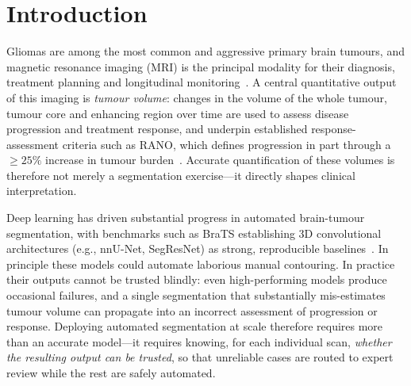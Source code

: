 \documentclass[11pt]{article}
\begin{document}
\section{Introduction}
Gliomas are among the most common and aggressive primary brain tumours, and magnetic
resonance imaging (MRI) is the principal modality for their diagnosis, treatment
planning and longitudinal monitoring~\cite{weller2021}. A central quantitative output
of this imaging is \emph{tumour volume}: changes in the volume of the whole tumour,
tumour core and enhancing region over time are used to assess disease progression and
treatment response, and underpin established response-assessment criteria such as
RANO, which defines progression in part through a $\geq 25\%$ increase in tumour
burden~\cite{wen2010}. Accurate quantification of these volumes is therefore not merely
a segmentation exercise---it directly shapes clinical interpretation.

Deep learning has driven substantial progress in automated brain-tumour segmentation,
with benchmarks such as BraTS establishing 3D convolutional architectures (e.g.,
nnU-Net, SegResNet) as strong, reproducible baselines~\cite{isensee2021,baid2021}. In
principle these models could automate laborious manual contouring. In practice their
outputs cannot be trusted blindly: even high-performing models produce occasional
failures, and a single segmentation that substantially mis-estimates tumour volume can
propagate into an incorrect assessment of progression or response. Deploying automated
segmentation at scale therefore requires more than an accurate model---it requires
knowing, for each individual scan, \emph{whether the resulting output can be trusted},
so that unreliable cases are routed to expert review while the rest are safely
automated.
\end{document}
